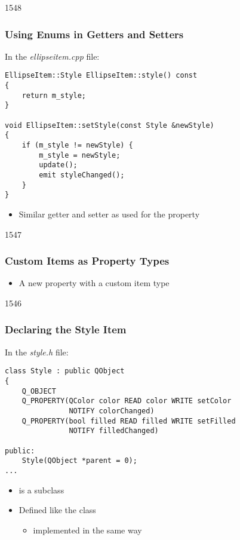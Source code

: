 \begin{slide}[fragile]{1548}\frametitle{Using Enums in Getters and Setters}

In the \textit{ellipseitem.cpp} file:

\vspace*{0.25em}
\begin{lstlisting}
EllipseItem::Style EllipseItem::style() const
{
    return m_style;
}

void EllipseItem::setStyle(const Style &newStyle)
{
    if (m_style != newStyle) {
        m_style = newStyle;
        update();
        emit styleChanged();
    }
}
\end{lstlisting}

\begin{itemize}
\item Similar getter and setter as used for the  property
\end{itemize}

\end{slide}

\begin{slide}[fragile]{1547}\frametitle{Custom Items as Property Types}


\begin{itemize}
\item A new  property with a custom item type
\end{itemize}

\end{slide}

\begin{slide}[fragile]{1546}\frametitle{Declaring the Style Item}

In the \textit{style.h} file:

\vspace*{0.5em}
\begin{lstlisting}
class Style : public QObject
{
    Q_OBJECT
    Q_PROPERTY(QColor color READ color WRITE setColor
               NOTIFY colorChanged)
    Q_PROPERTY(bool filled READ filled WRITE setFilled
               NOTIFY filledChanged)

public:
    Style(QObject *parent = 0);
...
\end{lstlisting}

\begin{itemize}
\item {} is a  subclass
\item Defined like the  class
  \begin{itemize}
  \item implemented in the same way
  \end{itemize}
\end{itemize}

\end{slide}


